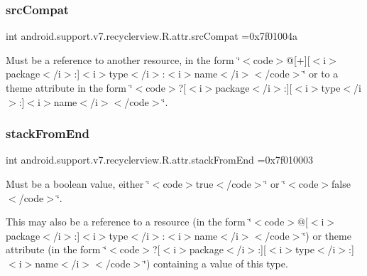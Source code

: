 \subsubsection{\texorpdfstring{src\+Compat}{srcCompat}}
{\footnotesize\ttfamily int android.\+support.\+v7.\+recyclerview.\+R.\+attr.\+src\+Compat =0x7f01004a\hspace{0.3cm}{\ttfamily [static]}}

Must be a reference to another resource, in the form \char`\"{}$<$code$>$@\mbox{[}+\mbox{]}\mbox{[}$<$i$>$package$<$/i$>$\+:\mbox{]}$<$i$>$type$<$/i$>$\+:$<$i$>$name$<$/i$>$$<$/code$>$\char`\"{} or to a theme attribute in the form \char`\"{}$<$code$>$?\mbox{[}$<$i$>$package$<$/i$>$\+:\mbox{]}\mbox{[}$<$i$>$type$<$/i$>$\+:\mbox{]}$<$i$>$name$<$/i$>$$<$/code$>$\char`\"{}. \mbox{\label{classandroid_1_1support_1_1v7_1_1recyclerview_1_1R_1_1attr_ad9c45e4cdcbd483c78de77bf71c93b4a}} 
\subsubsection{\texorpdfstring{stack\+From\+End}{stackFromEnd}}
{\footnotesize\ttfamily int android.\+support.\+v7.\+recyclerview.\+R.\+attr.\+stack\+From\+End =0x7f010003\hspace{0.3cm}{\ttfamily [static]}}

Must be a boolean value, either \char`\"{}$<$code$>$true$<$/code$>$\char`\"{} or \char`\"{}$<$code$>$false$<$/code$>$\char`\"{}. 

This may also be a reference to a resource (in the form \char`\"{}$<$code$>$@\mbox{[}$<$i$>$package$<$/i$>$\+:\mbox{]}$<$i$>$type$<$/i$>$\+:$<$i$>$name$<$/i$>$$<$/code$>$\char`\"{}) or theme attribute (in the form \char`\"{}$<$code$>$?\mbox{[}$<$i$>$package$<$/i$>$\+:\mbox{]}\mbox{[}$<$i$>$type$<$/i$>$\+:\mbox{]}$<$i$>$name$<$/i$>$$<$/code$>$\char`\"{}) containing a value of this type. \mbox{\label{classandroid_1_1support_1_1v7_1_1recyclerview_1_1R_1_1attr_ad7cb90c06b78b041f7a48b35609fdfc6}} 
